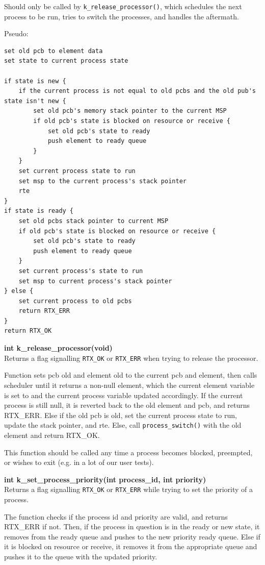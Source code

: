\documentclass[11pt, oneside]{article}
\begin{document}
Should only be called by {\tt k\_release\_processor()}, which schedules the next process to be run, tries to switch the processes, and handles the aftermath.

Pseudo:
\begin{verbatim}
set old pcb to element data
set state to current process state

if state is new {
    if the current process is not equal to old pcbs and the old pub's state isn't new {
        set old pcb's memory stack pointer to the current MSP
        if old pcb's state is blocked on resource or receive {
            set old pcb's state to ready
            push element to ready queue
        }
    }
    set current process state to run
    set msp to the current process's stack pointer
    rte
}
if state is ready {
    set old pcbs stack pointer to current MSP
    if old pcb's state is blocked on resource or receive {
        set old pcb's state to ready
        push element to ready queue
    }
    set current process's state to run
    set msp to current process's stack pointer
} else {
    set current process to old pcbs
    return RTX_ERR
}
return RTX_OK
\end{verbatim}

{\bf int k\_release\_processor(void)}\\
Returns a flag signalling {\tt RTX\_OK} or {\tt RTX\_ERR} when trying to release the processor.

Function sets pcb old and element old to the current pcb and element, then calls scheduler until it returns a non-null element, which the current element variable is set to and the current process variable updated accordingly.
If the current process is still null, it is reverted back to the old element and pcb, and returns RTX\_ERR.
Else if the old pcb is old, set the current process state to run, update the stack pointer, and rte.
Else, call {\tt process\_switch()} with the old element and return RTX\_OK.

This function should be called any time a process becomes blocked, preempted, or wishes to exit (e.g. in a lot of our user tests).

{\bf int k\_set\_process\_priority(int process\_id, int priority)}\\
Returns a flag signalling {\tt RTX\_OK} or {\tt RTX\_ERR} while trying to set the priority of a process.

The function checks if the process id and priority are valid, and returns RTX\_ERR if not. Then, if the process in question is in the ready or new state, it removes from the ready queue and pushes to the new priority ready queue. Else if it is blocked on resource or receive, it removes it from the appropriate queue and pushes it to the queue with the updated priority.
\end{document}
